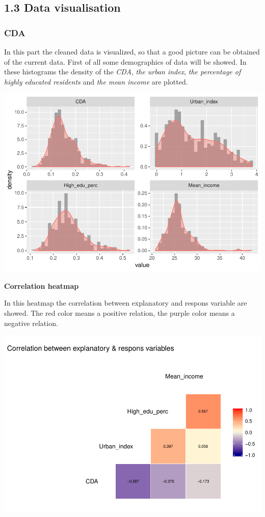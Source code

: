 \documentclass[11pt,]{article}
\begin{document}
\subsection{1.3 Data visualisation}\label{data-visualisation}

\subsubsection{CDA}\label{cda}

In this part the cleaned data is visualized, so that a good picture can
be obtained of the current data. First of all some demographics of data
will be showed. In these histograms the density of the \emph{CDA},
\emph{the urban index}, \emph{the percentage of highly educated
residents} and \emph{the mean income} are plotted.

\begin{center}\includegraphics{Report_files/figure-latex/demographics_data-1} \end{center}

\textbf{Correlation heatmap}

In this heatmap the correlation between explanatory and respons variable
are showed. The red color means a positive relation, the purple color
means a negative relation.

\begin{center}\includegraphics{Report_files/figure-latex/correlation_heatmap-1} \end{center}
\end{document}
